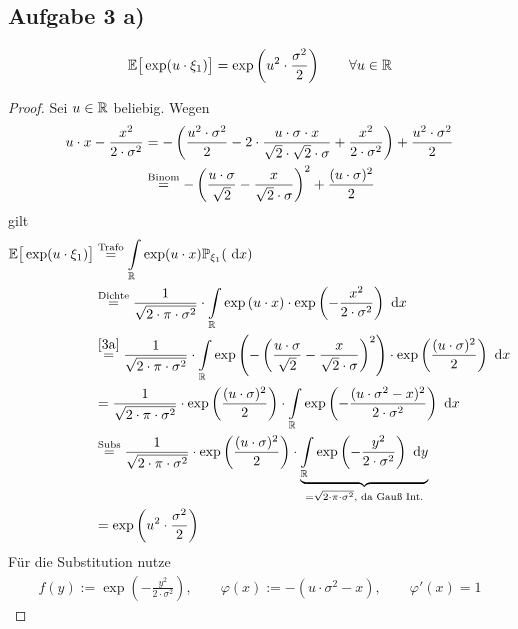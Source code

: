 \documentclass[12pt,a4paper]{article}
\begin{document}
\subsection*{Aufgabe 3 a)}
\begin{align*}
\mathbb{E}\big[\exp(u\cdot\xi_1)\big]=\exp\left(u^2\cdot\frac{\sigma^2}{2}\right)\qquad\forall u\in\mathbb{R}
\end{align*}

\begin{proof}
Sei $u\in\mathbb{R}$ beliebig. Wegen
\begin{align}\label{3a}
u\cdot x-\frac{x^2}{2\cdot\sigma^2}
&=-\left(\frac{u^2\cdot\sigma^2}{2}-2\cdot\frac{u\cdot\sigma\cdot x}{\sqrt{2}\cdot\sqrt{2}\cdot\sigma}+\frac{x^2}{2\cdot\sigma^2}\right)+\frac{u^2\cdot\sigma^2}{2}\\\nonumber
&\stackrel{\text{Binom}}{=}
-\left(\frac{u\cdot\sigma}{\sqrt{2}}-\frac{x}{\sqrt{2}\cdot\sigma}\right)^2+\frac{(u\cdot\sigma)^2}{2}
\end{align}
gilt
\begin{align*}
\mathbb{E}\big[\exp(u\cdot\xi_1)\big]
&\stackrel{\text{Trafo}}{=}
\int\limits_{\mathbb{R}}\exp(u\cdot x)\mathbb{P}_{\xi_1}(\text{ d} x)\\
&\stackrel{\text{Dichte}}{=}
\frac{1}{\sqrt{2\cdot\pi\cdot\sigma^2}}\cdot\int\limits_{\mathbb{R}} \exp\left(u\cdot x\right)\cdot \exp\left(-\frac{x^2}{2\cdot\sigma^2}\right)\text{ d} x\\
&\stackrel{\eqref{3a}}{=}
\frac{1}{\sqrt{2\cdot\pi\cdot\sigma^2}}\cdot\int\limits_{\mathbb{R}} \exp\left(-\left(\frac{u\cdot\sigma}{\sqrt{2}}-\frac{x}{\sqrt{2}\cdot\sigma}\right)^2\right) \cdot\exp\left(\frac{(u\cdot\sigma)^2}{2}\right)\text{ d} x\\
&=\frac{1}{\sqrt{2\cdot\pi\cdot\sigma^2}} \cdot \exp\left(\frac{(u\cdot\sigma)^2}{2}\right)\cdot\int\limits_{\mathbb{R}} \exp\left(-\frac{(u\cdot\sigma^2-x)^2}{2\cdot\sigma^2}\right)\text{ d} x\\
&\stackrel{\text{Subs}}{=}
\frac{1}{\sqrt{2\cdot\pi\cdot\sigma^2}}\cdot\exp\left(\frac{(u\cdot\sigma)^2}{2}\right)\cdot\underbrace{\int\limits_{\mathbb{R}} \exp\left(-\frac{y^2}{2\cdot\sigma^2}\right)\text{ d} y}_{=\sqrt{2\cdot\pi\cdot\sigma^2}\text{, da Gauß Int.}}\\
&=\exp\left(u^2\cdot\frac{\sigma^2}{2}\right)
\end{align*}
Für die Substitution nutze
\begin{align*}
f(y):=\exp\left(-\frac{y^2}{2\cdot\sigma^2}\right),\qquad\varphi(x):=-(u\cdot\sigma^2-x),\qquad\varphi'(x)=1
\end{align*}
\end{proof}
\end{document}
